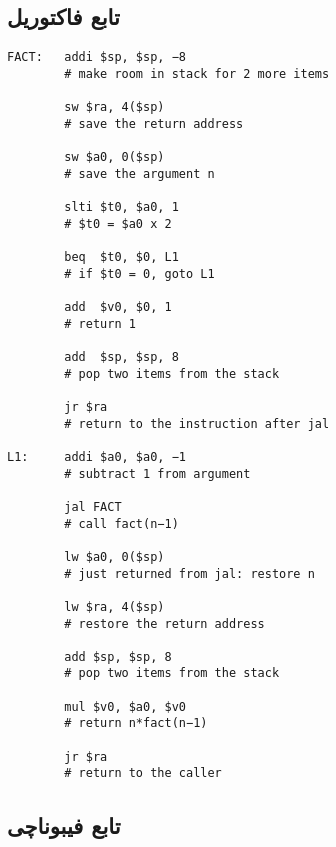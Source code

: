 \documentclass[11pt, dvipsnames, svgnames, x11names]{article}
\begin{document}
\subsection{تابع فاکتوریل}
\begin{latin}
\begin{lstlisting}[keywords={addi, sw, slti, beq, add, jr, jal, lw, mul}]
FACT:   addi $sp, $sp, −8 
        # make room in stack for 2 more items
        
        sw $ra, 4($sp)     
        # save the return address
        
        sw $a0, 0($sp)    
        # save the argument n
        
        slti $t0, $a0, 1    
        # $t0 = $a0 x 2
        
        beq  $t0, $0, L1    
        # if $t0 = 0, goto L1
        
        add  $v0, $0, 1     
        # return 1
        
        add  $sp, $sp, 8    
        # pop two items from the stack
        
        jr $ra              
        # return to the instruction after jal

L1:     addi $a0, $a0, −1   
        # subtract 1 from argument
        
        jal FACT            
        # call fact(n−1)
        
        lw $a0, 0($sp)      
        # just returned from jal: restore n
        
        lw $ra, 4($sp)      
        # restore the return address
        
        add $sp, $sp, 8     
        # pop two items from the stack
        
        mul $v0, $a0, $v0   
        # return n*fact(n−1)
        
        jr $ra              
        # return to the caller
\end{lstlisting}
\end{latin}
\subsection{تابع فیبوناچی}
\end{document}
